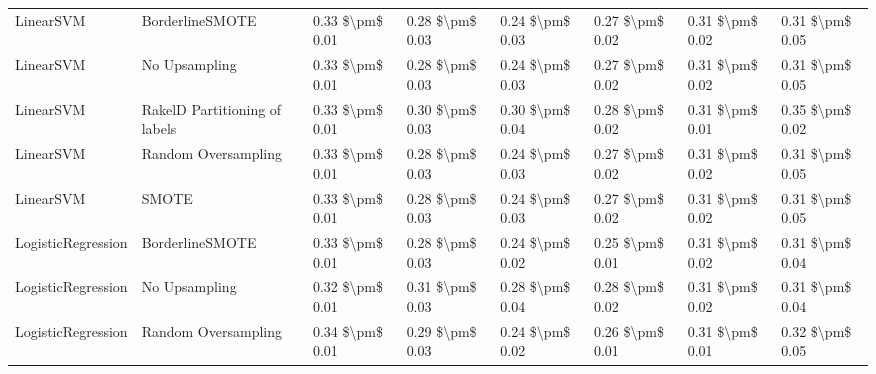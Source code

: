 \begin{tabular}{llllllll}
                      LinearSVM &               BorderlineSMOTE &     0.33 \$\textbackslash pm\$ 0.01 &           0.28 \$\textbackslash pm\$ 0.03 &       0.24 \$\textbackslash pm\$ 0.03 &        0.27 \$\textbackslash pm\$ 0.02 &                         0.31 \$\textbackslash pm\$ 0.02 & 0.31 \$\textbackslash pm\$ 0.05 \\
                      LinearSVM &                 No Upsampling &     0.33 \$\textbackslash pm\$ 0.01 &           0.28 \$\textbackslash pm\$ 0.03 &       0.24 \$\textbackslash pm\$ 0.03 &        0.27 \$\textbackslash pm\$ 0.02 &                         0.31 \$\textbackslash pm\$ 0.02 & 0.31 \$\textbackslash pm\$ 0.05 \\
                      LinearSVM & RakelD Partitioning of labels &     0.33 \$\textbackslash pm\$ 0.01 &           0.30 \$\textbackslash pm\$ 0.03 &       0.30 \$\textbackslash pm\$ 0.04 &        0.28 \$\textbackslash pm\$ 0.02 &                         0.31 \$\textbackslash pm\$ 0.01 & 0.35 \$\textbackslash pm\$ 0.02 \\
                      LinearSVM &           Random Oversampling &     0.33 \$\textbackslash pm\$ 0.01 &           0.28 \$\textbackslash pm\$ 0.03 &       0.24 \$\textbackslash pm\$ 0.03 &        0.27 \$\textbackslash pm\$ 0.02 &                         0.31 \$\textbackslash pm\$ 0.02 & 0.31 \$\textbackslash pm\$ 0.05 \\
                      LinearSVM &                         SMOTE &     0.33 \$\textbackslash pm\$ 0.01 &           0.28 \$\textbackslash pm\$ 0.03 &       0.24 \$\textbackslash pm\$ 0.03 &        0.27 \$\textbackslash pm\$ 0.02 &                         0.31 \$\textbackslash pm\$ 0.02 & 0.31 \$\textbackslash pm\$ 0.05 \\
             LogisticRegression &               BorderlineSMOTE &     0.33 \$\textbackslash pm\$ 0.01 &           0.28 \$\textbackslash pm\$ 0.03 &       0.24 \$\textbackslash pm\$ 0.02 &        0.25 \$\textbackslash pm\$ 0.01 &                         0.31 \$\textbackslash pm\$ 0.02 & 0.31 \$\textbackslash pm\$ 0.04 \\
             LogisticRegression &                 No Upsampling &     0.32 \$\textbackslash pm\$ 0.01 &           0.31 \$\textbackslash pm\$ 0.03 &       0.28 \$\textbackslash pm\$ 0.04 &        0.28 \$\textbackslash pm\$ 0.02 &                         0.31 \$\textbackslash pm\$ 0.02 & 0.31 \$\textbackslash pm\$ 0.04 \\
             LogisticRegression &           Random Oversampling &     0.34 \$\textbackslash pm\$ 0.01 &           0.29 \$\textbackslash pm\$ 0.03 &       0.24 \$\textbackslash pm\$ 0.02 &        0.26 \$\textbackslash pm\$ 0.01 &                         0.31 \$\textbackslash pm\$ 0.01 & 0.32 \$\textbackslash pm\$ 0.05 \\

\end{tabular}
